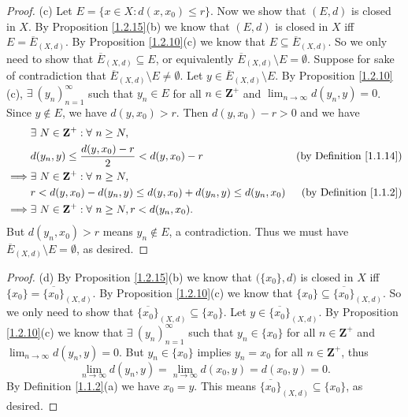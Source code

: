 \begin{proof}{(c)}
    Let \(E = \{x \in X : d(x, x_0) \leq r\}\).
    Now we show that \((E, d)\) is closed in \(X\).
    By Proposition \ref{1.2.15}(b) we know that \((E, d)\) is closed in \(X\) iff \(E = \overline{E}_{(X, d)}\).
    By Proposition \ref{1.2.10}(c) we know that \(E \subseteq \overline{E}_{(X, d)}\).
    So we only need to show that \(\overline{E}_{(X, d)} \subseteq E\), or equivalently \(\overline{E}_{(X, d)} \setminus E = \emptyset\).
    Suppose for sake of contradiction that \(\overline{E}_{(X, d)} \setminus E \neq \emptyset\).
    Let \(y \in \overline{E}_{(X, d)} \setminus E\).
    By Proposition \ref{1.2.10}(c), \(\exists\ (y_n)_{n = 1}^\infty\) such that \(y_n \in E\) for all \(n \in \mathbf{Z}^+\) and \(\lim_{n \to \infty} d(y_n, y) = 0\).
    Since \(y \notin E\), we have \(d(y, x_0) > r\).
    Then \(d(y, x_0) - r > 0\) and we have
    \begin{align*}
                 & \exists\ N \in \mathbf{Z}^+ : \forall\ n \geq N,                                                            \\
                 & d(y_n, y) \leq \frac{d(y, x_0) - r}{2} < d(y, x_0) - r                & \text{(by Definition \ref{1.1.14})} \\
        \implies & \exists\ N \in \mathbf{Z}^+ : \forall\ n \geq N,                                                            \\
                 & r < d(y, x_0) - d(y_n, y) \leq d(y, x_0) + d(y_n, y) \leq d(y_n, x_0) & \text{(by Definition \ref{1.1.2})}  \\
        \implies & \exists\ N \in \mathbf{Z}^+ : \forall\ n \geq N, r < d(y_n, x_0).
    \end{align*}
    But \(d(y_n, x_0) > r\) means \(y_n \notin E\), a contradiction.
    Thus we must have \(\overline{E}_{(X, d)} \setminus E = \emptyset\), as desired.
\end{proof}

\begin{proof}{(d)}
    By Proposition \ref{1.2.15}(b) we know that \(\big(\{x_0\}, d\big)\) is closed in \(X\) iff \(\{x_0\} = \overline{\{x_0\}}_{(X, d)}\).
    By Proposition \ref{1.2.10}(c) we know that \(\{x_0\} \subseteq \overline{\{x_0\}}_{(X, d)}\).
    So we only need to show that \(\overline{\{x_0\}}_{(X, d)} \subseteq \{x_0\}\).
    Let \(y \in \overline{\{x_0\}}_{(X, d)}\).
    By Proposition \ref{1.2.10}(c) we know that \(\exists\ (y_n)_{n = 1}^\infty\) such that \(y_n \in \{x_0\}\) for all \(n \in \mathbf{Z}^+\) and \(\lim_{n \to \infty} d(y_n, y) = 0\).
    But \(y_n \in \{x_0\}\) implies \(y_n = x_0\) for all \(n \in \mathbf{Z}^+\), thus
    \[
        \lim_{n \to \infty} d(y_n, y) = \lim_{n \to \infty} d(x_0, y) = d(x_0, y) = 0.
    \]
    By Definition \ref{1.1.2}(a) we have \(x_0 = y\).
    This means \(\overline{\{x_0\}}_{(X, d)} \subseteq \{x_0\}\), as desired.
\end{proof}

